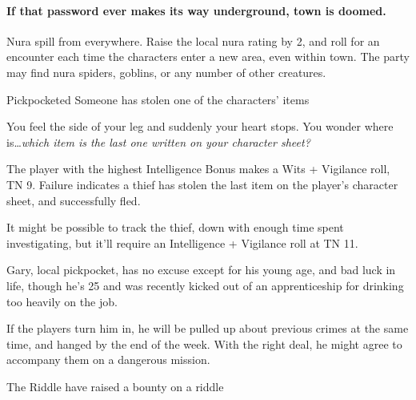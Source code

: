 \begin{multicols}{2}
\begin{itemize}
\end{itemize}



\paragraph{If that password ever makes its way underground, \gls{town} is doomed.}
Nura spill from everywhere.
Raise the local nura rating by 2, and roll for an encounter each time the characters enter a new area, even within \gls{town}.
The party may find nura spiders, goblins, or any number of other creatures.

\stopcontents[sq]

\label{randommeetings}

\startcontents[sq]

\sqminitoc

{Pickpocketed}%
{Someone has stolen one of the characters' items}%

\begin{boxtext}

	You feel the side of your leg and suddenly your heart stops.
	You wonder where is\ldots \textit{which item is the last one written on your character sheet?}

\end{boxtext}

The player with the highest Intelligence Bonus makes a Wits + Vigilance roll, TN 9.
Failure indicates a thief has stolen the last item on the player's character sheet, and successfully fled.

It might be possible to track the thief, down with enough time spent investigating, but it'll require an Intelligence + Vigilance roll at TN 11.

Gary, local pickpocket, has no excuse except for his young age, and bad luck in life, though he's 25 and was recently kicked out of an apprenticeship for drinking too heavily on the job.

If the players turn him in, he will be pulled up about previous crimes at the same time, and hanged by the end of the week.
With the right deal, he might agree to accompany them on a dangerous mission.


{The Riddle}%
{ have raised a bounty on a riddle}%


\end{multicols}
